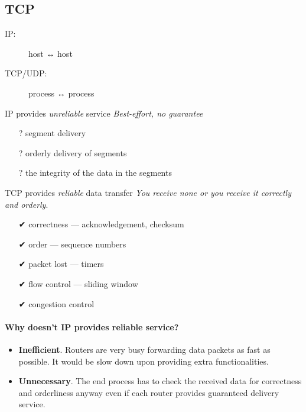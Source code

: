 \subsection{TCP}

\begin{frame}
  \begin{description}
  \item[IP:] host {\Large {\dejavu ↔}} host
  \item[TCP/UDP:] process {\Large {\dejavu ↔}} process
  \end{description}

  \begin{block}{IP provides \emph{unreliable} service}
    \emph{Best-effort, no guarantee}
    \begin{itemize}
    \item[?] segment delivery
    \item[?] orderly delivery of segments
    \item[?] the integrity of the data in the segments
    \end{itemize}
  \end{block}
  \begin{block}{TCP provides \emph{reliable} data transfer}
    \emph{You receive none or you receive it correctly and orderly}.
    \begin{itemize}
    \item[{\dejavu ✔}] correctness --- acknowledgement, checksum
    \item[{\dejavu ✔}] order --- sequence numbers
    \item[{\dejavu ✔}] packet lost --- timers
    \item[{\dejavu ✔}] flow control --- sliding window
    \item[{\dejavu ✔}] congestion control 
    \end{itemize}
  \end{block}
\end{frame}

\paragraph{Why doesn't IP provides reliable service?}

\begin{itemize}
\item \textbf{Inefficient}. Routers are very busy forwarding data packets as fast as
  possible. It would be slow down upon providing extra functionalities.
\item \textbf{Unnecessary}. The end process has to check the received data for correctness
  and orderliness anyway even if each router provides guaranteed delivery service.
\end{itemize}

